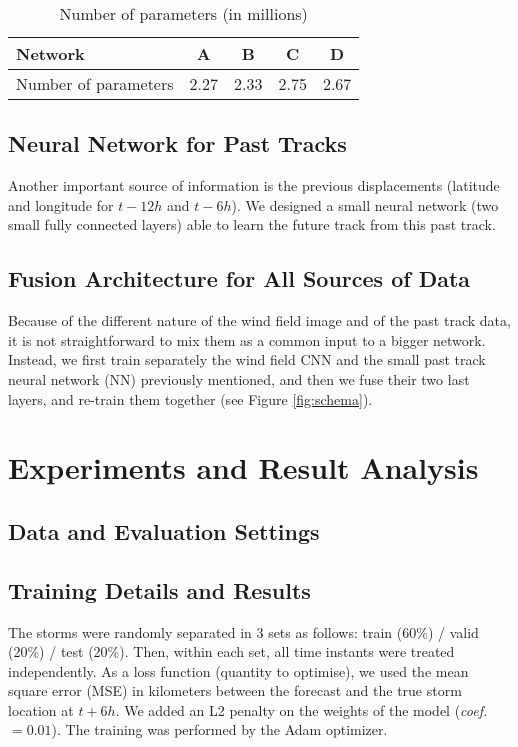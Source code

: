 \begin{table}[]
	\centering
	\caption{Number of parameters (in millions)}
	\begin{tabular}{|l|c|c|c|c|}
		\hline
		Network              & A    & B    & C    & D    \\ \hline
		Number of parameters & 2.27 & 2.33 & 2.75 & 2.67 \\ \hline
	\end{tabular}
\end{table}

\section{Neural Network for Past Tracks}
Another important source of information is the previous displacements
(latitude and longitude
for $t-12h$ and $t-6h$). We designed a small neural network (two small fully connected layers) able to learn the future track from this past track.

\section{Fusion Architecture for All Sources of Data}

Because of the different nature of the wind field image and of the past track data, it is not straightforward to mix them as a common input to a bigger network. Instead, we first train separately the wind field CNN and the small past track neural network (NN) previously mentioned, and then we fuse their two last layers, and re-train them together (see Figure \ref{fig:schema}). %

\chapter{Experiments and Result Analysis}
\section{Data and Evaluation Settings}

\section{Training Details and Results}
The storms were randomly separated in 3 sets as follows: train (60\%) / valid (20\%) / test (20\%).
Then, within each set, all time instants were treated independently.
As a loss function (quantity to optimise), we used the mean square error (MSE) in kilometers between the forecast and the true storm location at $t+6h$. We added an L2 penalty on the weights of the model (\emph{coef.}~$= 0.01$). The training was performed by the Adam optimizer.


